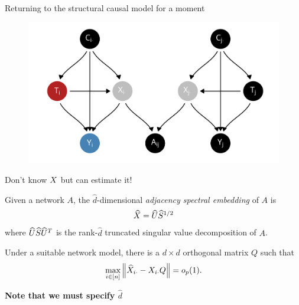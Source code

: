 \documentclass[aspectratio=169]{beamer}
\theoremstyle{remark}
\begin{document}
\begin{frame}{Returning to the structural causal model for a moment}

    \centering

    \begin{figure}
        \includegraphics[scale=0.7]{figures/dags/homophily-mediating.png}
    \end{figure}

\end{frame}

\begin{frame}{Don't know $X$ but can estimate it!}

    \begin{definition}[ASE]

        Given a network $A$, the $\widehat{d}$-dimensional \emph{adjacency spectral embedding} of $A$ is
        \begin{align*}
            \widehat{X} = \widehat{U} \widehat{S}^{1/2}
        \end{align*}
        \noindent where $\widehat{U} \widehat{S} \widehat{U}^T$ is the rank-$\widehat{d}$ truncated singular value decomposition of $A$.
    \end{definition}

    \begin{lemma}
        Under a suitable network model, there is a $d \times d$ orthogonal matrix $Q$ such that
        \begin{equation*}
            \max_{i \in [n]} \, \norm*{\Xhat_{i \cdot} - \X_{i \cdot} Q} = \op{1}.
        \end{equation*}
    \end{lemma}

    \centering
    \textbf{Note that we must specify $\widehat{d}$}
\end{frame}
\end{document}
